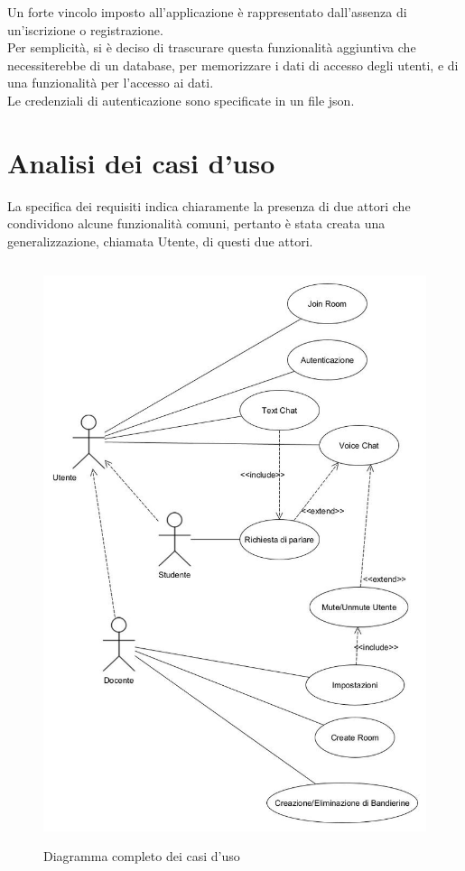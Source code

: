 Un forte vincolo imposto all'applicazione è rappresentato dall'assenza di un'iscrizione o registrazione.\\ Per semplicità, si è deciso di trascurare questa funzionalità aggiuntiva che necessiterebbe di un \gls{database}, per memorizzare i dati di accesso degli utenti, e di una funzionalità per l'accesso ai dati.
\\Le credenziali di autenticazione sono specificate in un file json.
\section{Analisi dei casi d'uso}
La specifica dei requisiti indica chiaramente la presenza di due attori che condividono alcune funzionalità comuni, pertanto è stata creata una generalizzazione, chiamata Utente, di questi due attori.
\begin{figure}[H]
    \centering
    \includegraphics[width = 14cm, height = 17cm]{Immagini/AppUseCase (complete).jpg}
    \caption{Diagramma completo dei casi d'uso }
    \label{fig:my_label}
\end{figure} 
